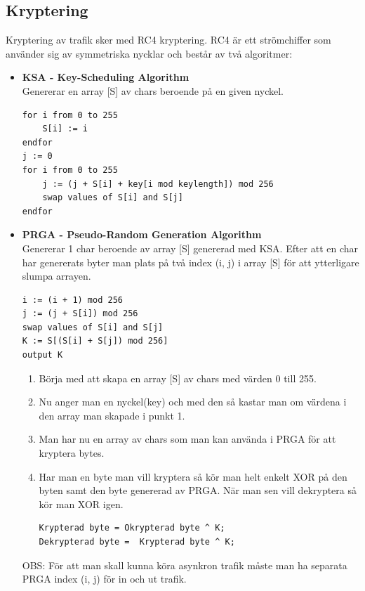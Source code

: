 \documentclass[10pt, titlepage, oneside, a4paper]{article}
\begin{document}
    	\subsection{Kryptering}
    	Kryptering av trafik sker med RC4 kryptering. RC4 är ett strömchiffer som använder sig av symmetriska nycklar och består av två algoritmer:
    	\begin{itemize}
    		\item\textbf{KSA - Key-Scheduling Algorithm}\\Genererar en array [S] av chars beroende på en given nyckel.
\begin{lstlisting}[frame = single]
for i from 0 to 255
    S[i] := i
endfor
j := 0
for i from 0 to 255
    j := (j + S[i] + key[i mod keylength]) mod 256
    swap values of S[i] and S[j]
endfor
\end{lstlisting}
    		
\item\textbf{PRGA - Pseudo-Random Generation Algorithm}\\Genererar 1 char beroende av array [S] genererad med KSA. Efter att en char har genererats byter man plats på två index (i, j) i array [S] för att ytterligare slumpa arrayen.

\begin{lstlisting}[frame = single]
i := (i + 1) mod 256
j := (j + S[i]) mod 256
swap values of S[i] and S[j]
K := S[(S[i] + S[j]) mod 256]
output K
\end{lstlisting}
    		\begin{enumerate}
    			\item Börja med att skapa en array [S] av chars med värden 0 till 255.
    			\item Nu anger man en nyckel(key) och med den så kastar man om värdena i den array man skapade i punkt 1.
    			\item Man har nu en array av chars som man kan använda i PRGA för att kryptera bytes.
    			\item Har man en byte man vill kryptera så kör man helt enkelt XOR på den byten samt den byte genererad av PRGA. När man sen vill dekryptera så kör man XOR igen.
    			\begin{lstlisting}[frame = single]
  Krypterad byte = Okrypterad byte ^ K;
Dekrypterad byte =  Krypterad byte ^ K;
    			\end{lstlisting}
    		\end{enumerate}
    		OBS: För att man skall kunna köra asynkron trafik måste man ha separata PRGA index (i, j) för in och ut trafik.

\end{itemize}
    	
\end{document}
